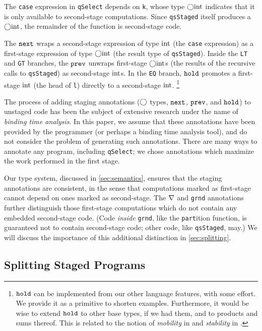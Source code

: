 \begin{abstrsyn}
The \texttt{case} expression in \texttt{qSelect} depends on \texttt{k}, whose
type $\bigcirc{\rm int}$ indicates that it is only available to second-stage
computations. Since \texttt{qsStaged} itself produces a $\bigcirc{\rm int}$, the
remainder of the function is second-stage code.

The ${\tt next}$ wraps a second-stage expression of type ${\rm int}$ (the \texttt{case}
expression) as a first-stage expression of type $\bigcirc{\rm int}$ (the result type
of \texttt{qsStaged}). Inside the \texttt{LT} and \texttt{GT} branches, the
${\tt prev}$ unwraps first-stage $\bigcirc{\rm int}$s (the results of the recursive calls
to \texttt{qsStaged}) as second-stage ${\rm int}$s. In the \texttt{EQ} branch,
${\tt hold}$ promotes a first-stage ${\rm int}$ (the head of \texttt{l}) directly to a
second-stage ${\rm int}$.%
\footnote{${\tt hold}$ can be implemented from our other language features, with
some effort. We provide it as a primitive to shorten examples. Furthermore, it
would be wise to extend ${\tt hold}$ to other base types, if we had them, and to
products and sums thereof.  This is related to the notion of {\em mobility} in
\cite{murphy05} and {\em stability} in \cite{krishnaswami13}.}

The process of adding staging annotations ($\bigcirc$ types, ${\tt next}$, ${\tt prev}$, and
${\tt hold}$) to unstaged code has been the subject of extensive research under the
name of \emph{binding time analysis}. In this paper, we assume that these
annotations have been provided by the programmer (or perhaps a binding time
analysis tool), and do not consider the problem of generating such annotations.
There are many ways to annotate any program, including \texttt{qSelect}; we
chose annotations which maximize the work performed in the first stage.

Our type system, discussed in \ref{sec:semantics}, ensures that the staging
annotations are consistent, in the sense that computations marked as
first-stage cannot depend on ones marked as second-stage. The $\nabla$ and
\texttt{grnd} annotations further distinguish those first-stage computations
which do not contain any embedded second-stage code. (Code \emph{inside}
\texttt{grnd}, like the \texttt{part}ition function, is guaranteed not to
contain second-stage code; other code, like \texttt{qsStaged}, may.) We will
discuss the importance of this additional distinction in \ref{sec:splitting}.

\subsection{Splitting Staged Programs}


\end{abstrsyn}
